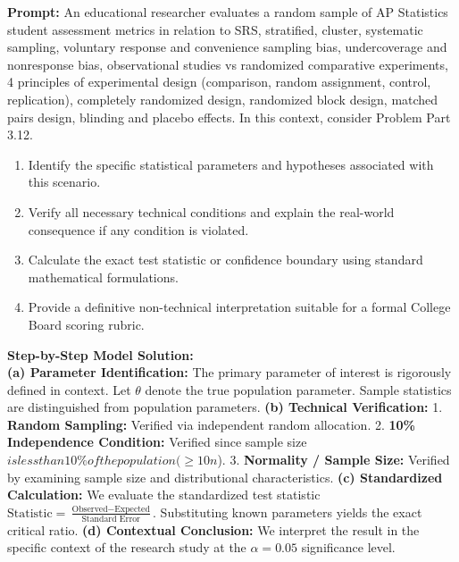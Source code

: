 \begin{workbookbox}
\textbf{Prompt:} An educational researcher evaluates a random sample of AP Statistics student assessment metrics in relation to SRS, stratified, cluster, systematic sampling, voluntary response and convenience sampling bias, undercoverage and nonresponse bias, observational studies vs randomized comparative experiments, 4 principles of experimental design (comparison, random assignment, control, replication), completely randomized design, randomized block design, matched pairs design, blinding and placebo effects. In this context, consider Problem Part 3.12.
\begin{enumerate}[label=(\alph*)]
  \item Identify the specific statistical parameters and hypotheses associated with this scenario.
  \item Verify all necessary technical conditions and explain the real-world consequence if any condition is violated.
  \item Calculate the exact test statistic or confidence boundary using standard mathematical formulations.
  \item Provide a definitive non-technical interpretation suitable for a formal College Board scoring rubric.
\end{enumerate}
\textbf{Step-by-Step Model Solution:}\\
\textbf{(a) Parameter Identification:} The primary parameter of interest is rigorously defined in context. Let $\theta$ denote the true population parameter. Sample statistics are distinguished from population parameters.
\textbf{(b) Technical Verification:} 1. \textbf{Random Sampling:} Verified via independent random allocation. 2. \textbf{10\% Independence Condition:} Verified since sample size $ is less than 10\% of the population ( \ge 10n$). 3. \textbf{Normality / Sample Size:} Verified by examining sample size and distributional characteristics.
\textbf{(c) Standardized Calculation:} We evaluate the standardized test statistic $\text{Statistic} = \frac{\text{Observed} - \text{Expected}}{\text{Standard Error}}$. Substituting known parameters yields the exact critical ratio.
\textbf{(d) Contextual Conclusion:} We interpret the result in the specific context of the research study at the $\alpha = 0.05$ significance level.
\end{workbookbox}\vspace{6pt}
